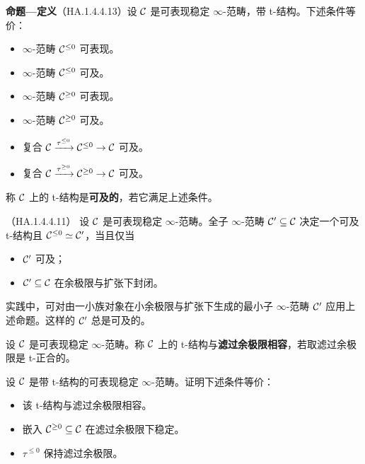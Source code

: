 \nitem\label{L16-4.1}\textbf{命题—定义}（HA.1.4.4.13）\quad 设 $\mathcal{C}$ 是可表现稳定 $\infty$-范畴，带 t-结构。下述条件等价：
\begin{itemize}[leftmargin=2.2em,itemsep=0.1em]
\item $\infty$-范畴 $\mathcal{C}^{\le0}$ 可表现。
\item $\infty$-范畴 $\mathcal{C}^{\le0}$ 可及。
\item $\infty$-范畴 $\mathcal{C}^{\ge0}$ 可表现。
\item $\infty$-范畴 $\mathcal{C}^{\ge0}$ 可及。
\item 复合 $\mathcal{C}\xrightarrow{\tau^{\le0}}\mathcal{C}^{\le0}\to\mathcal{C}$ 可及。
\item 复合 $\mathcal{C}\xrightarrow{\tau^{\ge0}}\mathcal{C}^{\ge0}\to\mathcal{C}$ 可及。
\end{itemize}
称 $\mathcal{C}$ 上的 t-结构是\textbf{可及的}，若它满足上述条件。

\begin{proposition}\label{L16-4.2}（HA.1.4.4.11）
设 $\mathcal{C}$ 是可表现稳定 $\infty$-范畴。全子 $\infty$-范畴 $\mathcal{C}'\subseteq\mathcal{C}$ 决定一个可及 t-结构且 $\mathcal{C}^{\le0}\simeq\mathcal{C}'$，当且仅当
\begin{itemize}[leftmargin=2.2em,itemsep=0.1em]
\item $\mathcal{C}'$ 可及；
\item $\mathcal{C}'\subseteq\mathcal{C}$ 在余极限与扩张下封闭。
\end{itemize}
\end{proposition}

\begin{remark}\label{L16-4.3}
实践中，可对由一小族对象在小余极限与扩张下生成的最小子 $\infty$-范畴 $\mathcal{C}'$ 应用上述命题。这样的 $\mathcal{C}'$ 总是可及的。
\end{remark}

\begin{definition}\label{L16-4.4}
设 $\mathcal{C}$ 是可表现稳定 $\infty$-范畴。称 $\mathcal{C}$ 上的 t-结构与\textbf{滤过余极限相容}，若取滤过余极限是 t-正合的。
\end{definition}

\begin{exercise}\label{L16-4.5}
设 $\mathcal{C}$ 是带 t-结构的可表现稳定 $\infty$-范畴。证明下述条件等价：
\begin{itemize}[leftmargin=2.2em,itemsep=0.1em]
\item 该 t-结构与滤过余极限相容。
\item 嵌入 $\mathcal{C}^{\ge0}\subseteq\mathcal{C}$ 在滤过余极限下稳定。
\item $\tau^{\le0}$ 保持滤过余极限。
\end{itemize}
\end{exercise}

